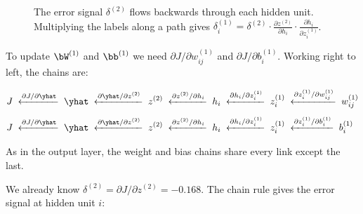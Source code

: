 \documentclass[12pt, a4paper]{article}
\begin{document}
\begin{figure}[H]
  \caption{The error signal $\delta^{(2)}$ flows backwards through each
    hidden unit.  Multiplying the labels along a path gives
    $\delta^{(1)}_i = \delta^{(2)} \cdot \frac{\partial z^{(2)}}{\partial h_i}
      \cdot \frac{\partial h_i}{\partial z^{(1)}_i}$.}
  \label{fig:hidden-chain}
\end{figure}

To update $\bW^{(1)}$ and $\bb^{(1)}$ we need
$\partial J / \partial w^{(1)}_{ij}$ and $\partial J / \partial b^{(1)}_i$.
Working right to left, the chains are:

\begin{align*}
  J \;\xleftarrow{\partial J/\partial \yhat}\;
  \yhat \;\xleftarrow{\partial \yhat/\partial z^{(2)}}\;
  z^{(2)} \;\xleftarrow{\partial z^{(2)}/\partial h_i}\;
  h_i \;\xleftarrow{\partial h_i/\partial z^{(1)}_i}\;
  z^{(1)}_i & \;\xleftarrow{\partial z^{(1)}_i/\partial w^{(1)}_{ij}}\;
  w^{(1)}_{ij}                                                          \\[0.4em]
  J \;\xleftarrow{\partial J/\partial \yhat}\;
  \yhat \;\xleftarrow{\partial \yhat/\partial z^{(2)}}\;
  z^{(2)} \;\xleftarrow{\partial z^{(2)}/\partial h_i}\;
  h_i \;\xleftarrow{\partial h_i/\partial z^{(1)}_i}\;
  z^{(1)}_i & \;\xleftarrow{\partial z^{(1)}_i/\partial b^{(1)}_i}\;
  b^{(1)}_i
\end{align*}

As in the output layer, the weight and bias chains share every link except
the last.

We already know $\delta^{(2)} = \partial J / \partial z^{(2)} = -0.168$.
The chain rule gives the error signal at hidden unit $i$:
\end{document}
